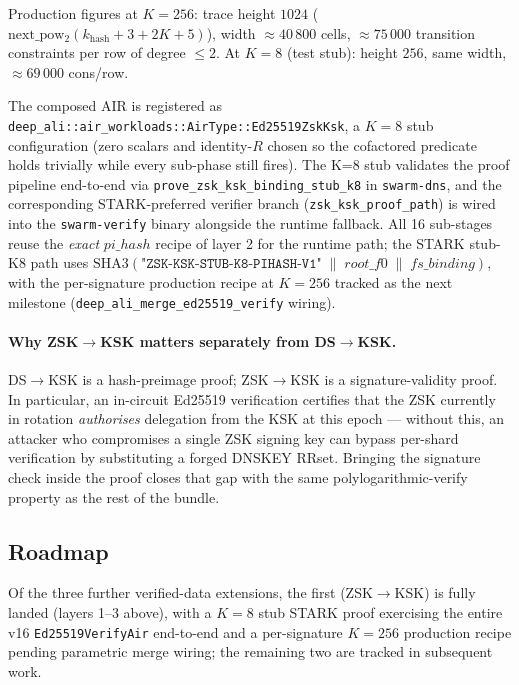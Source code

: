 \documentclass[11pt,a4paper]{article}
\theoremstyle{definition}
\theoremstyle{plain}
\begin{document}
\begin{description}[leftmargin=2em,style=nextline]
        Production figures at $K=256$: trace height $1024$
        ($\mathrm{next\_pow_2}(k_{\mathrm{hash}} + 3 + 2K + 5)$),
        width $\approx 40\,800$ cells, $\approx 75\,000$ transition
        constraints per row of degree $\le 2$.  At $K=8$ (test stub):
        height $256$, same width, $\approx 69\,000$ cons/row.

        The composed AIR is registered as
        \texttt{deep\_ali::air\_workloads::AirType::Ed25519ZskKsk}, a
        $K=8$ stub configuration (zero scalars and identity-$R$ chosen
        so the cofactored predicate holds trivially while every
        sub-phase still fires).  The K=8 stub validates the proof
        pipeline end-to-end via \texttt{prove\_zsk\_ksk\_binding\_stub\_k8}
        in \texttt{swarm-dns}, and the corresponding STARK-preferred
        verifier branch (\texttt{zsk\_ksk\_proof\_path}) is wired into
        the \texttt{swarm-verify} binary alongside the runtime
        fallback.  All 16 sub-stages reuse the \emph{exact}
        $\mathit{pi\_hash}$ recipe of layer 2 for the runtime path; the
        STARK stub-K8 path uses
        $\mathrm{SHA3}(\texttt{"ZSK-KSK-STUB-K8-PIHASH-V1"} \;\|\;
         \mathit{root\_f0} \;\|\; \mathit{fs\_binding})$, with the
        per-signature production recipe at $K=256$ tracked as the
        next milestone (\texttt{deep\_ali\_merge\_ed25519\_verify}
        wiring).
\end{description}

\paragraph{Why ZSK$\to$KSK matters separately from DS$\to$KSK.}
DS$\to$KSK is a hash-preimage proof; ZSK$\to$KSK is a signature-validity
proof.  In particular, an in-circuit Ed25519 verification certifies
that the ZSK currently in rotation \emph{authorises} delegation from
the KSK at this epoch — without this, an attacker who compromises a
single ZSK signing key can bypass per-shard verification by
substituting a forged DNSKEY RRset.  Bringing the signature check
inside the proof closes that gap with the same polylogarithmic-verify
property as the rest of the bundle.

\subsection{Roadmap}
\label{sec:roadmap-validity}

Of the three further verified-data extensions, the first
(ZSK$\to$KSK) is fully landed (layers 1--3 above), with a
$K=8$ stub STARK proof exercising the entire v16 \texttt{Ed25519VerifyAir}
end-to-end and a per-signature $K=256$ production recipe pending
parametric merge wiring; the remaining two are tracked in subsequent
work.
\end{document}
